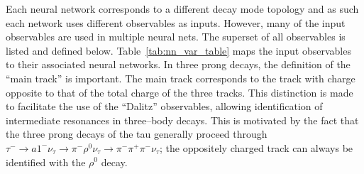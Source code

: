Each neural network corresponds to a different decay mode topology and as such
each network uses different observables as inputs.  However, many of the input
observables are used in multiple neural nets.  The superset of all observables
is listed and defined below. Table~\ref{tab:nn_var_table} maps the input
observables to their associated neural networks.  
In three prong
decays, the definition of the ``main track'' is important.  The main track
corresponds to the track with charge opposite to that of the total charge of the
three tracks.  This distinction is made to facilitate the use of the ``Dalitz''
observables, allowing identification of intermediate resonances in three--body
decays.  This is motivated by the fact that the three prong decays of the tau
generally proceed through $\tau^{-} \to a1^{-} \nu_\tau \rightarrow
\pi^{-} \rho^0 \nu_\tau \to \pi^{-} \pi^{+} \pi^{-} \nu_\tau$; the
oppositely charged track can always be identified with the $\rho^0$ decay.



